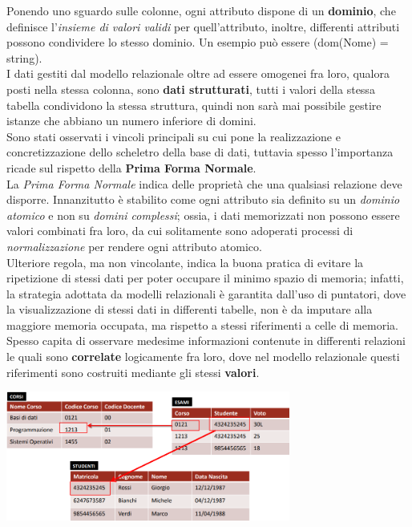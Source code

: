 \documentclass{article}
\begin{document}
Ponendo uno sguardo sulle colonne, ogni attributo dispone di un \textbf{dominio}, che definisce l'\textit{insieme di valori validi} per quell'attributo, inoltre, differenti attributi possono condividere lo stesso dominio. Un esempio può essere (dom(Nome) = string).\vspace{14pt}\\
I dati gestiti dal modello relazionale oltre ad essere omogenei fra loro, qualora posti nella stessa colonna, sono \textbf{dati strutturati}, tutti i valori della stessa tabella condividono la stessa struttura, quindi non sarà mai possibile gestire istanze che abbiano un numero inferiore di domini.\vspace{14pt}\\
Sono stati osservati i vincoli principali su cui pone la realizzazione e concretizzazione dello scheletro della base di dati, tuttavia spesso l'importanza ricade sul rispetto della \textbf{Prima Forma Normale}.\\La \textit{Prima Forma Normale} indica delle proprietà che una qualsiasi relazione deve disporre. Innanzitutto è stabilito come ogni attributo sia definito su un \textit{dominio atomico} e non su \textit{domini complessi}; ossia, i dati memorizzati non possono essere valori combinati fra loro, da cui solitamente sono adoperati processi di \textit{normalizzazione} per rendere ogni attributo atomico.\\
Ulteriore regola, ma non vincolante, indica la buona pratica di evitare la ripetizione di stessi dati per poter occupare il minimo spazio di memoria; infatti, la strategia adottata da modelli relazionali è garantita dall'uso di puntatori, dove la visualizzazione di stessi dati in differenti tabelle, non è da imputare alla maggiore memoria occupata, ma rispetto a stessi riferimenti a celle di memoria.\\ 
Spesso capita di osservare medesime informazioni contenute in differenti relazioni le quali sono \textbf{correlate} logicamente fra loro, dove nel modello relazionale questi riferimenti sono costruiti mediante gli stessi \textbf{valori}.
\begin{center}
    \includegraphics[width = 0.7\textwidth]{foto 3.png}
\end{center}
\end{document}
